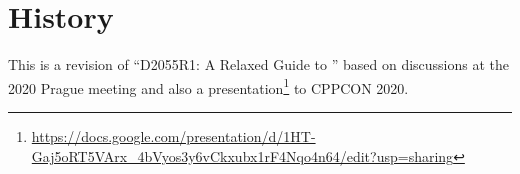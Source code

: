 \documentclass[10]{article}
\begin{document}
\section{History}
\label{sec:History}

This is a revision of 
``D2055R1: A Relaxed Guide to ''
based on discussions at the 2020 Prague meeting and also a
presentation\footnote{
	\url{https://docs.google.com/presentation/d/1HT-Gaj5oRT5VArx_4bVyos3y6vCkxubx1rF4Nqo4n64/edit?usp=sharing}}
to CPPCON 2020.



\end{document}
